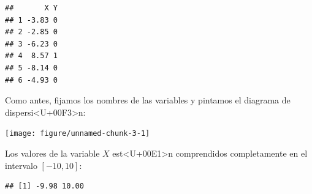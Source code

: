 \documentclass[10pt,a4paper]{article}
\begin{document}
\begin{knitrout}
\color{fgcolor}\begin{kframe}
\begin{alltt}
 \hlkwb{=} \hlstd{(}\hlstd{,}
                           \hlstd{=} \hlstd{,} \hlstd{=}\hlstd{)}
\end{alltt}
\begin{verbatim}
##       X Y
## 1 -3.83 0
## 2 -2.85 0
## 3 -6.23 0
## 4  8.57 1
## 5 -8.14 0
## 6 -4.93 0
\end{verbatim}
\end{kframe}
\end{knitrout}
Como antes, fijamos los nombres de las variables y pintamos el diagrama de dispersi<U+00F3>n:
\begin{knitrout}
\color{fgcolor}

{\centering \texttt{[image: figure/unnamed-chunk-3-1]} 

}



\end{knitrout}

Los valores de la variable $X$ est<U+00E1>n comprendidos completamente en el intervalo $[-10, 10]$:
\begin{knitrout}
\color{fgcolor}\begin{kframe}
\begin{alltt}
\end{alltt}
\begin{verbatim}
## [1] -9.98 10.00
\end{verbatim}
\end{kframe}
\end{knitrout}
\end{document}

